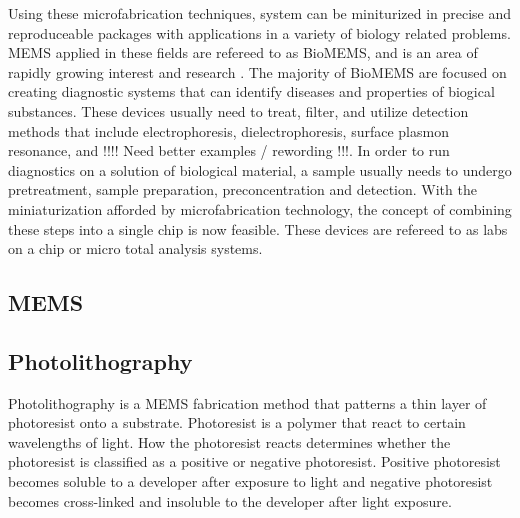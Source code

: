  \par Using these microfabrication techniques, system can be miniturized in precise and reproduceable packages with applications in a variety of biology related problems. MEMS applied in these fields are refereed to as BioMEMS, and is an area of rapidly growing interest and research \cite{grayson_biomems_2004}. The majority of BioMEMS are focused on creating diagnostic systems that can identify diseases and properties of biogical substances. These devices usually need to treat, filter, and utilize detection methods that include electrophoresis, dielectrophoresis, surface plasmon resonance, and !!!! Need better examples / rewording !!!. In order to run diagnostics on a solution of biological material, a sample usually needs to undergo pretreatment, sample preparation, preconcentration and detection. With the miniaturization afforded by microfabrication technology, the concept of combining these steps into a single chip is now feasible. These devices are refereed to as labs on a chip or micro total analysis systems.
 
 \subsection{MEMS}
 
 \subsection*{Photolithography}
 
 \par Photolithography is a MEMS fabrication method that patterns a thin layer of photoresist onto a substrate. Photoresist is a polymer that react to certain wavelengths of light. How the photoresist reacts determines whether the photoresist is classified as a positive or negative photoresist. Positive photoresist becomes soluble to a developer after exposure to light and negative photoresist becomes cross-linked and insoluble to the developer after light exposure. 
 
